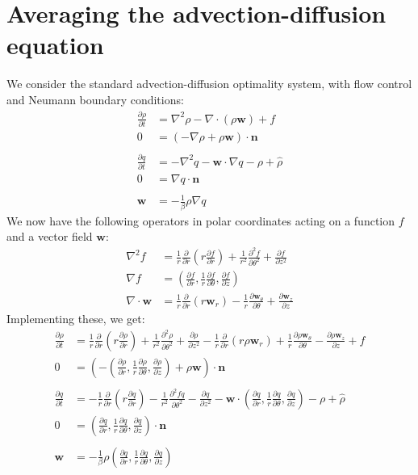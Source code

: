 \documentclass[11pt, a4paper]{article}
\theoremstyle{definition}
\newcommand{\w}{\mathbf{w}}
\newcommand{\n}{\mathbf{n}}
\newcommand{\hr}{\widehat \rho}
\begin{document}
	
	\section{Averaging the advection-diffusion equation}
	We consider the standard advection-diffusion optimality system, with flow control and Neumann boundary conditions:
	\begin{align*}
		\frac{\partial \rho}{\partial t} &= \nabla^2 \rho - \nabla \cdot (\rho \w) + f\\
		0 &= (- \nabla \rho + \rho \w) \cdot \n \\
		\\
		\frac{\partial q}{\partial t} &= - \nabla^2 q - \w \cdot \nabla q - \rho + \hr\\
		0 &= \nabla q \cdot \n \\
		\\
		\w &= - \frac{1}{\beta}\rho \nabla q
	\end{align*}
	We now have the following operators in polar coordinates acting on a function $f$ and a vector field $\w$:
	\begin{align*}
		\nabla^2 f &= \frac{1}{r} \frac{\partial}{\partial r} \left( r \frac{\partial f}{\partial r}\right) + \frac{1}{r^2} \frac{\partial^2 f}{\partial \theta^2} + \frac{\partial f}{\partial z^2}\\
		\nabla f &= \left(\frac{\partial f}{\partial r}, \frac{1}{r}\frac{\partial f}{\partial \theta}, \frac{\partial f}{\partial z}\right)\\
		\nabla \cdot \w &= \frac{1}{r}\frac{\partial }{\partial r}\left(r \w_r\right) - \frac{1}{r}\frac{\partial \w_\theta}{\partial \theta} + \frac{\partial \w_z}{\partial z}
	\end{align*}
	Implementing these, we get:
	\begin{align*}
		\frac{\partial \rho}{\partial t} &= \frac{1}{r} \frac{\partial}{\partial r} \left( r \frac{\partial \rho}{\partial r}\right) + \frac{1}{r^2} \frac{\partial^2 \rho}{\partial \theta^2} + \frac{\partial \rho}{\partial z^2} - \frac{1}{r}\frac{\partial }{\partial r}\left(r \rho\w_r\right) + \frac{1}{r}\frac{\partial \rho\w_\theta}{\partial \theta} - \frac{\partial \rho\w_z}{\partial z} + f\\
		0 &= \left(- \left(\frac{\partial \rho}{\partial r}, \frac{1}{r}\frac{\partial \rho}{\partial \theta}, \frac{\partial \rho}{\partial z}\right) + \rho \w \right) \cdot \n \\
		\\
		\frac{\partial q}{\partial t} &= -  \frac{1}{r} \frac{\partial}{\partial r} \left( r \frac{\partial q}{\partial r}\right) - \frac{1}{r^2} \frac{\partial^2 fq}{\partial \theta^2} - \frac{\partial q}{\partial z^2} - \w \cdot \left(\frac{\partial q}{\partial r}, \frac{1}{r}\frac{\partial q}{\partial \theta}, \frac{\partial q}{\partial z}\right) - \rho + \hr\\
		0 &= \left(\frac{\partial q}{\partial r}, \frac{1}{r}\frac{\partial q}{\partial \theta}, \frac{\partial q}{\partial z}\right) \cdot \n \\
		\\
		\w &= - \frac{1}{\beta}\rho  \left(\frac{\partial q}{\partial r}, \frac{1}{r}\frac{\partial q}{\partial \theta}, \frac{\partial q}{\partial z}\right)
	\end{align*}
\end{document}

